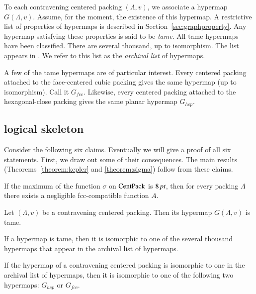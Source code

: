 To each contravening centered packing $(\Lambda,v)$, we associate a hypermap
$G(\Lambda,v)$.   Assume, for the moment, the existence of this hypermap.
A restrictive list of properties of hypermaps is described in
Section~\ref{sec:graphproperty}. Any hypermap satisfying these
properties is said to be {\it tame}. All  tame
hypermaps have been classified. There are several thousand, up to
isomorphism.  The list appears in \cite{web}.  We refer to this
list as the {\it archival list}
of hypermaps.

A few of the tame hypermaps are of particular interest. Every
centered packing attached to the face-centered cubic packing gives
the same hypermap (up to isomorphism).  Call it $G_{fcc}$.
Likewise, every centered packing attached to the hexagonal-close
packing gives the same planar hypermap $G_{hcp}$.


\subsection{logical skeleton}
\label{sec:logic}

Consider the following six claims.  Eventually we will give a
proof of all six statements.  First, we draw out some of their
consequences.  The main results (Theorems~\ref{theorem:kepler} and
\ref{theorem:sigma}) follow from these claims.

\begin{claim}\label{claim-A}
If the maximum of the function $\sigma$ on ${\operatorname{CentPack}}$ is $8\,\hbox{\it pt}$,
then for every %
packing $\Lambda$ there exists a
negligible fcc-compatible function $A$.
\end{claim}

\begin{claim}\label{claim-B}
Let $(\Lambda,v)$ be a contravening centered packing. Then its hypermap
$G(\Lambda,v)$ is tame.
\end{claim} %

\begin{claim}\label{claim-C}
If a hypermap is tame, then it is isomorphic to one of the several
thousand hypermaps that appear in the archival list of hypermaps.
\end{claim} %

\begin{claim}\label{claim-D}
If the hypermap of a contravening centered packing is isomorphic
to one in the archival list of hypermaps, then it is isomorphic to
one of the following two hypermaps:  $G_{hcp}$ or $G_{fcc}$.
\end{claim} %


